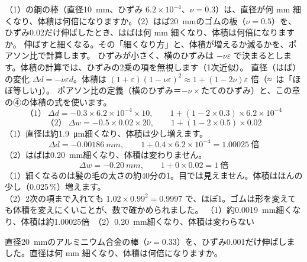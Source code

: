 \begin{phreidai}
\label{ph:力-8:ex8}（1）の鋼の棒（直径\qty{10}{mm}、ひずみ $6.2\times10^{-4}$、$\nu=0.3$）は、直径が何 mm 細くなり、体積は何倍になりますか。（2）はば\qty{20}{mm}のゴムの板（$\nu=0.5$）を、ひずみ0.02だけ伸ばしたとき、はばは何 mm 細くなり、体積は何倍になりますか。
\phbamen
伸ばすと細くなる。その「細くなり方」と、体積が増えるか減るかを、ポアソン比で計算します。
\phmushi
ひずみが小さく、横のひずみは $-\nu\varepsilon$ で決まるとします。体積の計算では、ひずみの2乗の項を無視します（1次近似）。
\phzu
直径（はば）の変化 $\Delta d=-\nu\varepsilon d$。体積は $(1+\varepsilon)(1-\nu\varepsilon)^2\approx1+(1-2\nu)\varepsilon$ 倍\mbox{（≈ は}「ほぼ等しい」）。
\phriyu
ポアソン比の定義（横のひずみ＝$-\nu\times$たてのひずみ）と、この章の④の体積の式を使います。
\phtateru
\[\text{（1）}\ \Delta d=-0.3\times6.2\times10^{-4}\times10,\qquad 1+(1-2\times0.3)\times6.2\times10^{-4}\]
\[\text{（2）}\ \Delta w=-0.5\times0.02\times20,\qquad 1+(1-2\times0.5)\times0.02\]
\phtoku
（1）直径は約\qty{1.9}{\micro m}細くなり、体積は少し増えます。
\[\Delta d=\qty{-0.00186}{mm},\qquad 1+0.4\times6.2\times10^{-4}=1.00025\ \text{倍}\]
（2）はばは\qty{0.20}{mm}細くなり、体積は変わりません。
\[\Delta w=\qty{-0.20}{mm},\qquad 1+0\times0.02=1\ \text{倍}\]
\phtashikame
（1）細くなるのは髪の毛の太さの約40分の1。目では見えません。体積はほんの少し（0.025\,\%）増えます。\\
（2）2次の項まで入れても $1.02\times0.99^2=0.9997$ で、ほぼ1。ゴムは形を変えても体積を変えにくいことが、数で確かめられました。
\kotae （1）約\qty{0.0019}{mm}細くなり、体積は約1.00025倍　（2）\qty{0.20}{mm}細くなり、体積は変わらない
\end{phreidai}
\begin{jibun}
直径\qty{20}{mm}のアルミニウム合金の棒（$\nu=0.33$）を、ひずみ0.001だけ伸ばしました。直径は何 mm 細くなり、体積は何倍になりますか。
\end{jibun}

